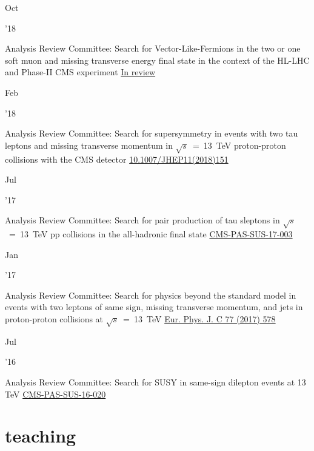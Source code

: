 \documentclass[]{cv} %
\begin{document}
\begin{entrylist}

  \entry
  {\parbox[t]{\parboxWidthOne}{Oct}\parbox[t]{\parboxWidthTwo}{\hfill '18}}
  {Analysis Review Committee: Search for Vector-Like-Fermions in the two or one
  soft muon and missing transverse energy final state in the context of the
  HL-LHC and Phase-II CMS experiment}
  {\href{}{In review}}
  {}

  \entry
  {\parbox[t]{\parboxWidthOne}{Feb}\parbox[t]{\parboxWidthTwo}{\hfill '18}}
  {Analysis Review Committee: Search for supersymmetry in events with two tau
  leptons and missing transverse momentum in $\sqrt{s}$~=~13~TeV proton-proton
  collisions with the CMS detector}
  {\href{https://link.springer.com/article/10.1007\%2FJHEP11\%282018\%29151}{10.1007/JHEP11(2018)151}}
  {}

  \entrytwo
  {\parbox[t]{\parboxWidthOne}{Jul}\parbox[t]{\parboxWidthTwo}{\hfill '17}}
  {Analysis Review Committee: Search for pair production of tau sleptons in
  $\sqrt{s}$~=~13~TeV pp collisions in the all-hadronic final state}
  {\href{https://cds.cern.ch/record/2273395}{CMS-PAS-SUS-17-003}}
  {}

  \entrytwo
  {\parbox[t]{\parboxWidthOne}{Jan}\parbox[t]{\parboxWidthTwo}{\hfill '17}}
  {Analysis Review Committee: Search for physics beyond the standard model in
  events with two leptons of same sign, missing transverse momentum, and jets in
  proton-proton collisions at $\sqrt{s}$~=~13~TeV}
  {\href{https://link.springer.com/article/10.1140\%2Fepjc\%2Fs10052-017-5079-z}{Eur. Phys. J. C 77 (2017) 578}}
  {}

  \entry
  {\parbox[t]{\parboxWidthOne}{Jul}\parbox[t]{\parboxWidthTwo}{\hfill '16}}
  {Analysis Review Committee: Search for SUSY in same-sign dilepton events at 13 TeV}
  {\href{https://cds.cern.ch/record/2204929}{CMS-PAS-SUS-16-020}}
  {}

\end{entrylist}

\section{teaching}
\end{document}
